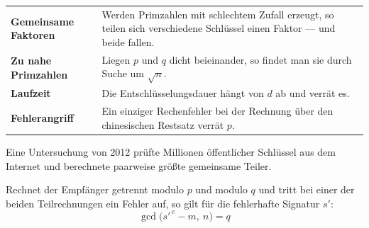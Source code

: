 \begin{warnung}
\begin{center}
{\small
\renewcommand{\arraystretch}{1.5}
\begin{tabular}{@{}P{2.4cm}P{6.2cm}@{}}
\toprule
\textbf{Gemeinsame Faktoren} & Werden Primzahlen mit schlechtem Zufall erzeugt, so teilen sich verschiedene Schlüssel einen Faktor --- und beide fallen.\\
\textbf{Zu nahe Primzahlen} & Liegen $p$ und $q$ dicht beieinander, so findet man sie durch Suche um $\sqrt n$.\\
\textbf{Laufzeit} & Die Entschlüsselungsdauer hängt von $d$ ab und verrät es.\\
\textbf{Fehlerangriff} & Ein einziger Rechenfehler bei der Rechnung über den chinesischen Restsatz verrät $p$.\\
\bottomrule
\end{tabular}}
\end{center}

Eine Untersuchung von 2012 prüfte Millionen öffentlicher Schlüssel aus dem Internet und berechnete paarweise größte gemeinsame Teiler.

\begin{center}
\begin{minipage}{0.88\textwidth}
\end{minipage}
\end{center}

Rechnet der Empfänger getrennt modulo $p$ und modulo $q$ und tritt bei einer der beiden Teilrechnungen ein Fehler auf, so gilt für die fehlerhafte Signatur $s'$:
\[ \gcd\bigl(s'^{\,e} - m,\ n\bigr) = q \]

\begin{center}
\begin{minipage}{0.88\textwidth}
\end{minipage}
\end{center}
\end{warnung}


